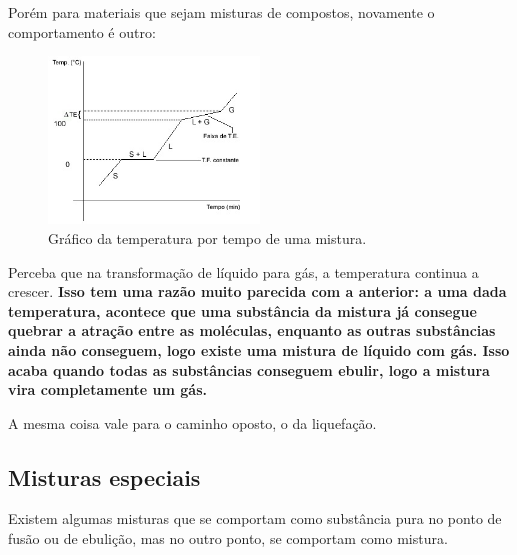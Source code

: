 \documentclass[12pt]{extarticle}
\newcommand{\<}{\langle}
\renewcommand{\>}{\rangle}
\theoremstyle{definition}
\begin{document}
Porém para materiais que sejam misturas de compostos, novamente o comportamento é outro:
\begin{figure}[H]
    \centering
    \includegraphics[width=0.5\textwidth]{ebulicao_irregular.jpg}
    \caption{Gráfico da temperatura por tempo de uma mistura.}
    \label{fig:mistura_ebulicao}
\end{figure}

Perceba que na transformação de líquido para gás, a temperatura continua a crescer. \textbf{Isso tem uma razão muito parecida com a anterior: a uma dada temperatura, acontece que uma substância da mistura já consegue quebrar a atração entre as moléculas, enquanto as outras substâncias ainda não conseguem, logo existe uma mistura de líquido com gás. Isso acaba quando todas as substâncias conseguem ebulir, logo a mistura vira completamente um gás.}

A mesma coisa vale para o caminho oposto, o da liquefação.

\subsection{Misturas especiais}
Existem algumas misturas que se comportam como substância pura no ponto de fusão ou de ebulição, mas no outro ponto, se comportam como mistura.
\end{document}
